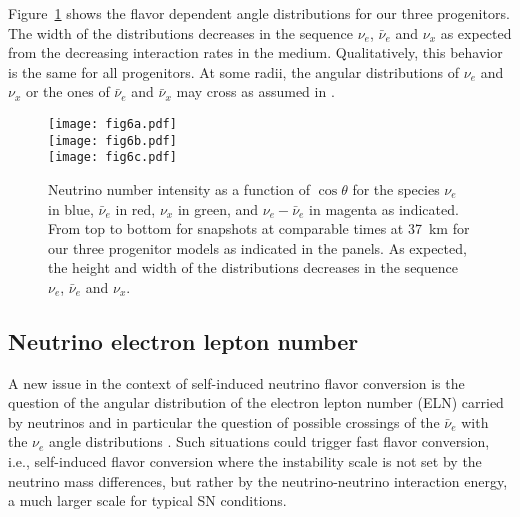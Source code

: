 \documentclass[iop,twocolappendix,numberedappendix]{emulateapj}
\begin{document}
Figure~\ref{fig:angular_evolution} shows the flavor dependent angle
distributions for our three progenitors. The width of the distributions
decreases in the sequence $\nu_e$, $\bar\nu_e$ and $\nu_x$
\citep{Ott:2008jb,Sarikas:2011am} as expected from the decreasing interaction
rates in the medium. Qualitatively, this behavior is the same for all
progenitors. At some radii, the angular distributions of $\nu_e$ and $\nu_x$ or
the ones of $\bar{\nu}_e$ and $\bar{\nu}_x$ may cross as assumed in
\cite{Mirizzi:2011tu}.

\begin{figure}
\begin{center}
  \texttt{[image: fig6a.pdf]}  \\
  \texttt{[image: fig6b.pdf]} \\
\hspace{-2.3mm} \texttt{[image: fig6c.pdf]}
  \caption{Neutrino number intensity as a function of $\cos\theta$ for the
  species $\nu_e$ in blue, $\bar{\nu}_e$ in red, $\nu_x$ in green, and $\nu_e-\bar{\nu}_e$ 
  in magenta as indicated.
  From top to bottom for snapshots at comparable times at 37~km for our three
  progenitor models as indicated in the panels. As expected, the
  height and width of the distributions decreases in the sequence
  $\nu_e$, $\bar\nu_e$ and $\nu_x$.}
  \label{fig:angular_evolution}
\end{center}
\end{figure}



\subsection{Neutrino electron lepton number}\label{sec:oscillations}

A new issue in the context of self-induced neutrino flavor conversion is the
question of the angular distribution of the electron lepton number (ELN)
carried by neutrinos and in particular the question of possible crossings of
the $\bar{\nu}_e$ with the $\nu_e$ angle distributions
\citep{Sawyer:2015dsa,Izaguirre:2016gsx}. Such situations could trigger fast
flavor conversion, i.e., self-induced flavor conversion where the instability
scale is not set by the neutrino mass differences, but rather by the
neutrino-neutrino interaction energy, a much larger scale for typical SN
conditions.
\end{document}
